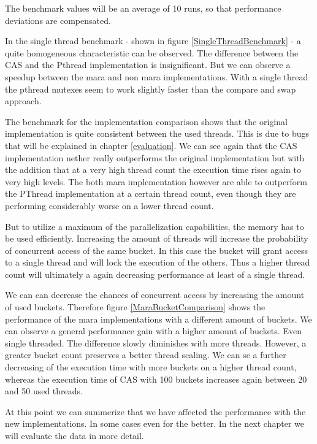 The benchmark values will be an average of 10 runs, so that performance deviations are compensated.

In the single thread benchmark - shown in figure \ref{SingleThreadBenchmark} - a quite homogeneous characteristic can be observed. The difference between the CAS and the Pthread implementation is insignificant. But we can observe a speedup between the mara and non mara implementations. With a single thread the pthread mutexes seem to work slightly faster than the compare and swap approach.


The benchmark for the implementation comparison shows that the original implementation is quite consistent between the used threads. This is due to bugs that will be explained in chapter \ref{evaluation}. We can see again that the CAS implementation nether really outperforms the original implementation but with the addition that at a very high thread count the execution time rises again to very high levels. The both mara implementation however are able to outperform the PThread implementation at a certain thread count, even though they are performing considerably worse on a lower thread count.


But to utilize a maximum of the parallelization capabilities, the memory has to be used efficiently. Increasing the amount of threads will increase the probability of concurrent access of the same bucket. In this case the bucket will grant access to a single thread and will lock the execution of the others. Thus a higher thread count will ultimately a again decreasing performance at least of a single thread.

We can can decrease the chances of concurrent access by increasing the amount of used buckets. Therefore figure \ref{MaraBucketComparison} shows the performance of the mara implementations with a different amount of buckets. We can observe a general performance gain with a higher amount of buckets. Even single threaded. The difference slowly diminishes with more threads. However, a greater bucket count preserves a better thread scaling. We can se a further decreasing of the execution time with more buckets on a higher thread count, whereas the execution time of CAS with 100 buckets increases again between 20 and 50 used threads.

At this point we can summerize that we have affected the performance with the new implementations. In some cases even for the better. In the next chapter we will evaluate the data in more detail.


